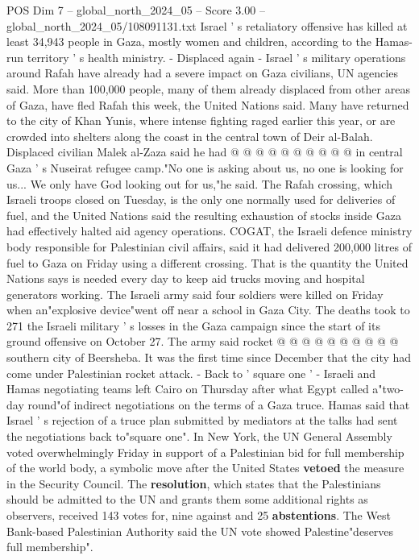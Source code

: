 \begin{textsample}{POS Dim 7 – global\_north\_2024\_05 – Score 3.00 – global\_north\_2024\_05/108091131.txt}
Israel ' s retaliatory offensive has killed at least 34,943 people in Gaza, mostly women and children, according to the Hamas-run territory ' s health ministry. - Displaced again - Israel ' s military operations around Rafah have already had a severe impact on Gaza civilians, UN agencies said.
More than 100,000 people, many of them already displaced from other areas of Gaza, have fled Rafah this week, the United Nations said.
Many have returned to the city of Khan Yunis, where intense fighting raged earlier this year, or are crowded into shelters along the coast in the central town of Deir al-Balah.
Displaced civilian Malek al-Zaza said he had @ @ @ @ @ @ @ @ @ @ in central Gaza ' s Nuseirat refugee camp."No one is asking about us, no one is looking for us...
We only have God looking out for us,"he said.
The Rafah crossing, which Israeli troops closed on Tuesday, is the only one normally used for deliveries of fuel, and the United Nations said the resulting exhaustion of stocks inside Gaza had effectively halted aid agency operations.
COGAT, the Israeli defence ministry body responsible for Palestinian civil affairs, said it had delivered 200,000 litres of fuel to Gaza on Friday using a different crossing.
That is the quantity the United Nations says is needed every day to keep aid trucks moving and hospital generators working.
The Israeli army said four soldiers were killed on Friday when an"explosive device"went off near a school in Gaza City.
The deaths took to 271 the Israeli military ' s losses in the Gaza campaign since the start of its ground offensive on October 27.
The army said rocket @ @ @ @ @ @ @ @ @ @ southern city of Beersheba.
It was the first time since December that the city had come under Palestinian rocket attack. - Back to ' square one ' - Israeli and Hamas negotiating teams left Cairo on Thursday after what Egypt called a"two-day round"of indirect negotiations on the terms of a Gaza truce.
Hamas said that Israel ' s rejection of a truce plan submitted by mediators at the talks had sent the negotiations back to"square one".
In New York, the UN General Assembly voted overwhelmingly Friday in support of a Palestinian bid for full membership of the world body, a symbolic move after the United States \textbf{vetoed} the measure in the Security Council.
The \textbf{resolution}, which states that the Palestinians should be admitted to the UN and grants them some additional rights as observers, received 143 votes for, nine against and 25 \textbf{abstentions}.
The West Bank-based Palestinian Authority said the UN vote showed Palestine"deserves full membership".

\end{textsample}

